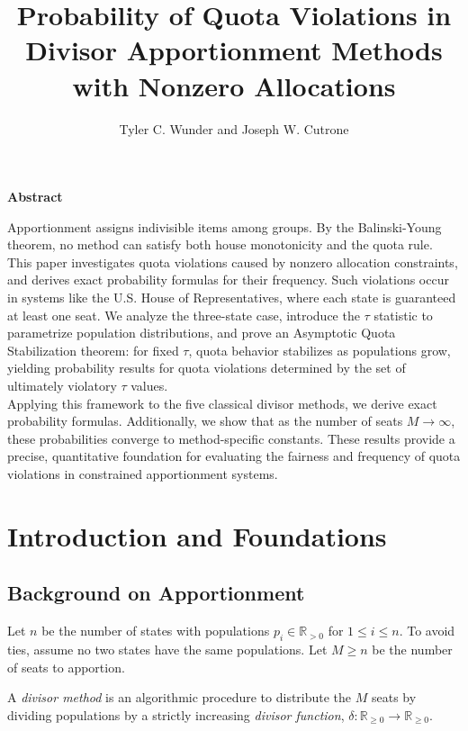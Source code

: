 \documentclass[11pt]{article}
\title{Probability of Quota Violations in Divisor Apportionment Methods with Nonzero Allocations}
\author{Tyler C. Wunder and Joseph W. Cutrone}
\theoremstyle{definition}
\theoremstyle{definition}
\renewenvironment{abstract}{
 \begin{center}
 {\small\textbf{Abstract}\par}  %
 \begin{minipage}{.85\textwidth}
}{
 \end{minipage}
 \end{center}
 \vspace{1em}
}
\begin{document}

\begin{abstract}
Apportionment assigns indivisible items among groups. By the Balinski-Young theorem, no method can satisfy both house monotonicity and the quota rule. This paper investigates quota violations caused by nonzero allocation constraints, and derives exact probability formulas for their frequency. Such violations occur in systems like the U.S. House of Representatives, where each state is guaranteed at least one seat. We analyze the three-state case, introduce the $\tau$ statistic to parametrize population distributions, and prove an Asymptotic Quota Stabilization theorem: for fixed $\tau$, quota behavior stabilizes as populations grow, yielding probability results for quota violations determined by the set of ultimately violatory $\tau$ values.\\

Applying this framework to the five classical divisor methods, we derive exact probability formulas. Additionally, we show that as the number of seats $M \to \infty$, these probabilities converge to method-specific constants. These results provide a precise, quantitative foundation for evaluating the fairness and frequency of quota violations in constrained apportionment systems. 

\end{abstract}

\section{Introduction and Foundations}

\subsection{Background on Apportionment}
Let $n$ be the number of states with populations $p_i \in \mathbb{R}_{>0}$ for $1\leq i \leq n$. To avoid ties, assume no two states have the same populations. Let $M \geq n$ be the number of seats to apportion. 

A \textit{divisor method} is an algorithmic procedure to distribute the $M$ seats by dividing populations by a strictly increasing \textit{divisor function}, $\delta: \mathbb{R}_{\geq 0} \to \mathbb{R}_{\geq 0}$. 
\end{document}
